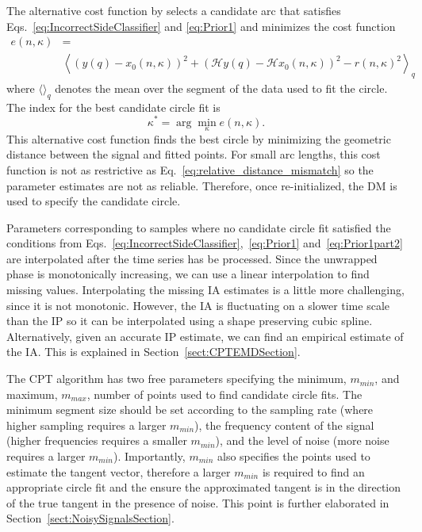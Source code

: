 \documentclass[journal,11pt,a4paper,onecolumn,draftcls]{IEEEtran}
\newcommand{\dean}[1]{\textsf{\emph{\textbf{\textcolor{green}{#1}}}}}
\begin{document}
The alternative cost function by selects a candidate arc that satisfies Eqs.~\ref{eq:IncorrectSideClassifier} and \ref{eq:Prior1} and minimizes the cost function
\begin{align}\label{BestCircFit2Reinitialize}
e\left( {n,\kappa} \right) &=  \\ \nonumber
 &\left\langle \left( y(q) - x_0\left( n,\kappa \right) \right)^2 + \left( \mathcal{H}y(q) - \mathcal{H}x_0\left( n,\kappa \right) \right)^2 - r\left( n,\kappa \right)^2 \right\rangle_q
\end{align}
where $\langle\rangle_q$ denotes the mean over the segment of the data used to fit the circle. The index for the best candidate circle fit is
\begin{equation}\label{ReinitBestIndex}
\kappa^ * = \arg \mathop {\min }\limits_\kappa e\left( {n,\kappa} \right).
\end{equation}
This alternative cost function finds the best circle by minimizing the geometric distance between the signal and fitted points. For small arc lengths, this cost function is not as restrictive as Eq.~\ref{eq:relative_distance_mismatch} so the parameter estimates are not as reliable. Therefore, once re-initialized, the DM is used to specify the candidate circle. %

Parameters corresponding to samples where no candidate circle fit satisfied the conditions from Eqs.~\ref{eq:IncorrectSideClassifier},~\ref{eq:Prior1} and~\ref{eq:Prior1part2} are interpolated after the time series has be processed. Since the unwrapped phase is monotonically increasing, we can use a linear interpolation to find missing values. Interpolating the missing IA estimates is a little more challenging, since it is not monotonic. However, the IA is fluctuating on a slower time scale than the IP so it can be interpolated using a shape preserving cubic spline. Alternatively, given an accurate IP estimate, we can find an empirical estimate of the IA. This is explained in Section~\ref{sect:CPTEMDSection}. 

The CPT algorithm has two free parameters specifying the minimum, $m_{min}$, and maximum, $m_{max}$, number of points used to find candidate circle fits. The minimum segment size should be set according to the sampling rate (where higher sampling requires a larger $m_{min}$), the frequency content of the signal (higher frequencies requires a smaller $m_{min}$), and the level of noise (more noise requires a larger $m_{min}$). Importantly, $m_{min}$ also specifies the points used to estimate the tangent vector, therefore a larger $m_{min}$ is required to find an appropriate circle fit and the ensure the approximated tangent is in the direction of the true tangent in the presence of noise. This point is further elaborated in Section~\ref{sect:NoisySignalsSection}. 
\end{document}

